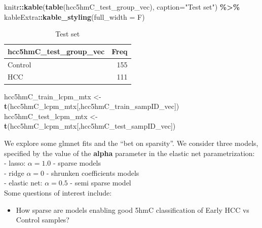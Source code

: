 \documentclass[
]{book}
\newenvironment{Shaded}{\begin{snugshade}}{\end{snugshade}}
\newcommand{\DataTypeTok}[1]{\textcolor[rgb]{0.13,0.29,0.53}{#1}}
\newcommand{\KeywordTok}[1]{\textcolor[rgb]{0.13,0.29,0.53}{\textbf{#1}}}
\newcommand{\NormalTok}[1]{#1}
\newcommand{\OperatorTok}[1]{\textcolor[rgb]{0.81,0.36,0.00}{\textbf{#1}}}
\newcommand{\StringTok}[1]{\textcolor[rgb]{0.31,0.60,0.02}{#1}}
\providecommand{\tightlist}{%
  \setlength{\itemsep}{0pt}\setlength{\parskip}{0pt}}
\begin{document}
\begin{Shaded}
\begin{Highlighting}[]
\NormalTok{knitr}\OperatorTok{::}\KeywordTok{kable}\NormalTok{(}\KeywordTok{table}\NormalTok{(hcc5hmC\_test\_group\_vec),}
  \DataTypeTok{caption=}\StringTok{"Test set"}\NormalTok{) }\OperatorTok{\%>\%}
\StringTok{   }\NormalTok{kableExtra}\OperatorTok{::}\KeywordTok{kable\_styling}\NormalTok{(}\DataTypeTok{full\_width =}\NormalTok{ F)}
\end{Highlighting}
\end{Shaded}

\begin{table}

\caption{\label{tab:hcc5hmC-glmnetFit-getTrainVal}Test set}
\centering
\begin{tabular}[t]{l|r}
\hline
hcc5hmC\_test\_group\_vec & Freq\\
\hline
Control & 155\\
\hline
HCC & 111\\
\hline
\end{tabular}
\end{table}

\begin{Shaded}
\begin{Highlighting}[]
\NormalTok{hcc5hmC\_train\_lcpm\_mtx <{-}}\StringTok{ }\KeywordTok{t}\NormalTok{(hcc5hmC\_lcpm\_mtx[,hcc5hmC\_train\_sampID\_vec])}
\NormalTok{hcc5hmC\_test\_lcpm\_mtx <{-}}\StringTok{ }\KeywordTok{t}\NormalTok{(hcc5hmC\_lcpm\_mtx[,hcc5hmC\_test\_sampID\_vec])}
\end{Highlighting}
\end{Shaded}

We explore some glmnet fits and the ``bet on sparsity''.
We consider three models, specified by the value of the
\textbf{alpha} parameter in the elastic net parametrization:\\
- lasso: \(\alpha = 1.0\) - sparse models\\
- ridge \(\alpha = 0\) - shrunken coefficients models\\
- elastic net: \(\alpha = 0.5\) - semi sparse model\\

Some questions of interest include:

\begin{itemize}
\tightlist
\item
  How sparse are models enabling good 5hmC classification of Early HCC vs Control samples?
\end{itemize}
\end{document}
